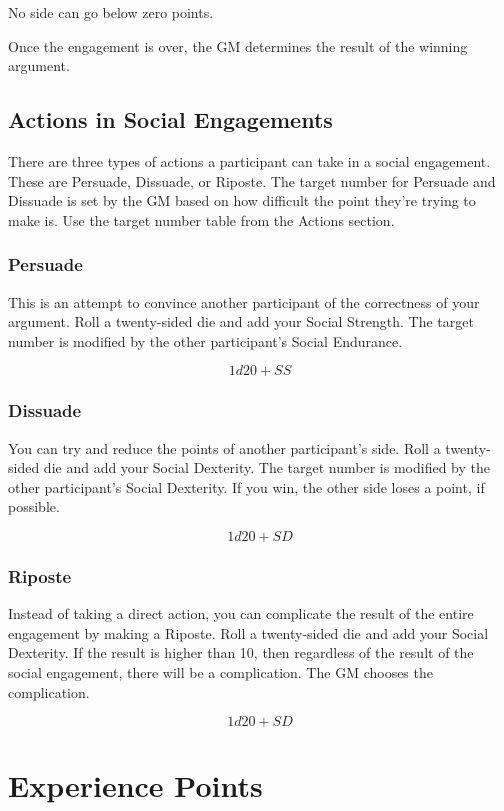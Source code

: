 \begin{multicols}{2}
No side can go below zero points.

Once the engagement is over, the GM determines the result of the winning argument.

\subsection{Actions in Social Engagements}

There are three types of actions a participant can take in a social engagement.
These are Persuade, Dissuade, or Riposte. The target number for Persuade and
Dissuade is set by the GM based on how difficult the point they're trying to
make is. Use the target number table from the Actions section.

\subsubsection{Persuade}

This is an attempt to convince another participant of the correctness of your argument. Roll a 
twenty-sided die and add your Social Strength. The target number is modified by the other
participant's Social Endurance.

$$1d20 + SS$$

\subsubsection{Dissuade}

You can try and reduce the points of another participant's side. Roll a twenty-sided die 
and add your Social Dexterity. The target number is modified by the other participant's
Social Dexterity. If you win, the other side loses a point, if possible.

$$1d20 + SD$$

\subsubsection{Riposte}

Instead of taking a direct action, you can complicate the result of the entire engagement 
by making a Riposte. Roll a twenty-sided die and add your Social Dexterity. If the result 
is higher than 10, then regardless of the result of the social engagement, there will be 
a complication. The GM chooses the complication.

$$1d20 + SD$$

\section{Experience Points}


\end{multicols}
